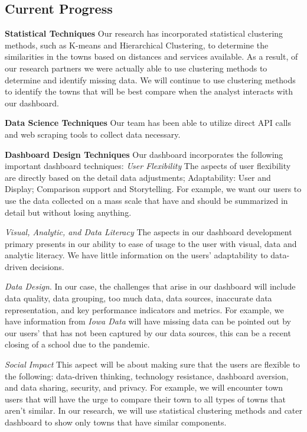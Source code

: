 \documentclass[10pt]{article}\usepackage[]{graphicx}\usepackage[]{color}
\begin{document}
\subsection{Current Progress}
{\bf Statistical Techniques} Our research has incorporated statistical clustering methods, such as K-means and Hierarchical Clustering, to determine the similarities in the towns based on distances and services available. As a result, of our research partners we were actually able to use clustering methods to determine and identify missing data. We will continue to use clustering methods to identify the towns that will be best compare when the analyst interacts with our dashboard. 

{\bf Data Science Techniques} Our team has been able to utilize direct API calls and web scraping tools to collect data necessary.  

{\bf Dashboard Design Techniques} Our dashboard incorporates the following important dashboard techniques:
{\it User Flexibility} The aspects of user flexibility are directly based on the detail data adjustments; Adaptability: User and Display; Comparison support and Storytelling. For example, we want our users to use the data collected on a mass scale that have and should be summarized in detail but without losing anything.

{\it Visual, Analytic, and Data Literacy} The aspects in our dashboard development primary presents in our ability to ease of usage to the user with visual, data  and analytic literacy. We have little information on the users' adaptability to data-driven decisions. 

{\it Data Design}. In our case, the challenges that arise in our dashboard will include data quality, data grouping, too much data, data sources, inaccurate data representation, and key performance indicators and metrics. For example, we have information from {\it Iowa Data} will have missing data can be pointed out by our users' that has not been captured by our data sources, this can be a recent closing of a school due to the pandemic.

{\it Social Impact} This aspect will be about making sure that the users are flexible to the following: data-driven thinking, technology resistance, dashboard aversion, and data sharing, security, and privacy. For example, we will encounter town users that will have the urge to compare their town to all types of towns that aren't similar. In our research, we will use statistical clustering methods and cater dashboard to show only towns that have similar components.
\end{document}
